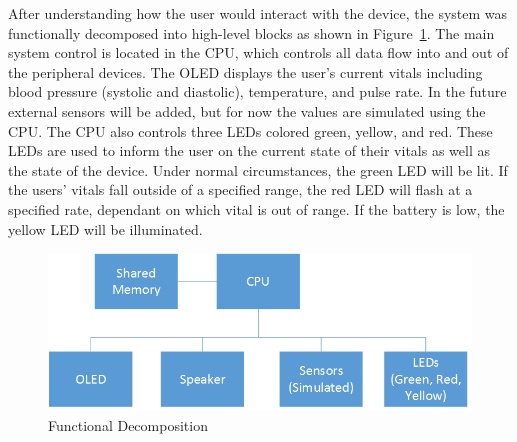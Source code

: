 \documentclass[12pt]{article} %
\begin{document}
After understanding how the user would interact with the device, the system was
functionally decomposed into high-level blocks as shown in
Figure~\ref{fig:func}.  The main system control is located in the CPU, which
controls all data flow into and out of the peripheral devices.  The OLED
displays the user's current vitals including blood pressure (systolic and
diastolic), temperature, and pulse rate.  In the future external sensors will
be added, but for now the values are simulated using the CPU.  The CPU also
controls three LEDs colored green, yellow, and red.  These LEDs are used to
inform the user on the current state of their vitals as well as the state of
the device.  Under normal circumstances, the green LED will be lit.  If the
users' vitals fall outside of a specified range, the red LED will flash at a
specified rate, dependant on which vital is out of range.  If the battery is
low, the yellow LED will be illuminated.

\begin{figure}[h]
    \centering
    \includegraphics[width=\textwidth]{../design/Functional_decomposition}
    \caption{Functional Decomposition}
    \label{fig:func}
\end{figure}
\end{document}
